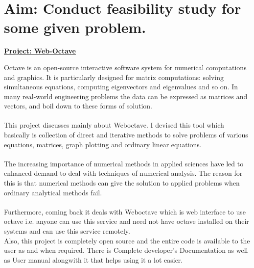 \section*{\fontsize{16}{14}\selectfont Aim: Conduct feasibility study for some given problem.}
\begin{center}\underline{\textbf{Project: Web-Octave}}\end{center}
Octave is an open-source interactive software system for numerical computations and
graphics. It is particularly designed for matrix computations: solving simultaneous equations, computing eigenvectors and eigenvalues and so on. In many real-world engineering
problems the data can be expressed as matrices and vectors, and boil down to these forms
of solution.\\\\
This project discusses mainly about Weboctave. I devised this tool which basically is collection of direct and iterative methods to solve problems of various equations, matrices, graph plotting and ordinary linear equations.\\\\
The increasing importance of numerical methods in applied sciences have led to enhanced demand to deal with techniques of numerical analysis. The reason for this is that numerical methods can give the solution to applied problems when ordinary analytical methods fail.\\\\
Furthermore, coming back it deals with Weboctave which is web interface to use octave i.e. anyone can use this service and need not have octave installed on their systems and can use this service remotely.\\
Also, this project is completely open source and the entire code is available 
to the user as and when required. There is Complete developer's 
Documentation as well as User manual alongwith it that helps using it a lot easier.

